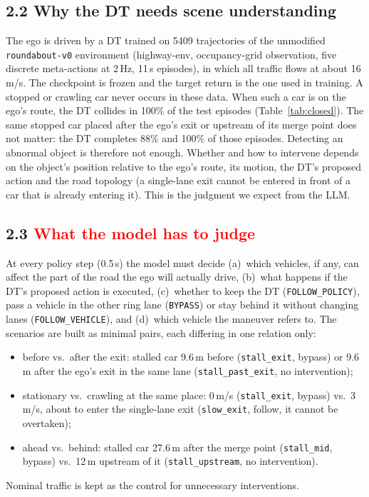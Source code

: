 \documentclass[11pt]{article}
\newcommand{\rev}[1]{\textcolor{red}{#1}}
\newenvironment{revblock}{\color{red}}{}
\begin{document}
\subsection*{2.2 Why the DT needs scene understanding}

The ego is driven by a DT trained on 5409 trajectories of the unmodified \texttt{roundabout-v0} environment
(highway-env, occupancy-grid observation, five discrete meta-actions at 2\,Hz, 11\,s episodes), in which all traffic
flows at about 16\,m/s. The checkpoint is frozen and the target return is the one used in training.
\begin{revblock}
A stopped or crawling car never occurs in these data. When such a car is on the ego's route, the DT collides in
100\% of the test episodes (Table~\ref{tab:closed}). The same stopped car placed after the ego's exit or upstream of
its merge point does not matter: the DT completes 88\% and 100\% of those episodes. Detecting an abnormal object is
therefore not enough. Whether and how to intervene depends on the object's position relative to the ego's route, its
motion, the DT's proposed action and the road topology (a single-lane exit cannot be entered in front of a car that
is already entering it). This is the judgment we expect from the LLM.
\end{revblock}

\subsection*{2.3 \rev{What the model has to judge}}

\begin{revblock}
At every policy step (0.5\,s) the model must decide (a)~which vehicles, if any, can affect the part of the road the ego
will actually drive, (b)~what happens if the DT's proposed action is executed, (c)~whether to keep the DT
(\texttt{FOLLOW\_POLICY}), pass a vehicle in the other ring lane (\texttt{BYPASS}) or stay behind it without changing
lanes (\texttt{FOLLOW\_VEHICLE}), and (d)~which vehicle the maneuver refers to. The scenarios are built as minimal
pairs, each differing in one relation only:
\begin{itemize}[nosep]
\item before vs.\ after the exit: stalled car 9.6\,m before (\texttt{stall\_exit}, bypass) or 9.6\,m after the ego's exit
  in the same lane (\texttt{stall\_past\_exit}, no intervention);
\item stationary vs.\ crawling at the same place: 0\,m/s (\texttt{stall\_exit}, bypass) vs.\ 3\,m/s, about to enter the
  single-lane exit (\texttt{slow\_exit}, follow, it cannot be overtaken);
\item ahead vs.\ behind: stalled car 27.6\,m after the merge point (\texttt{stall\_mid}, bypass) vs.\ 12\,m upstream of
  it (\texttt{stall\_upstream}, no intervention).
\end{itemize}
Nominal traffic is kept as the control for unnecessary interventions.
\end{revblock}
\end{document}
